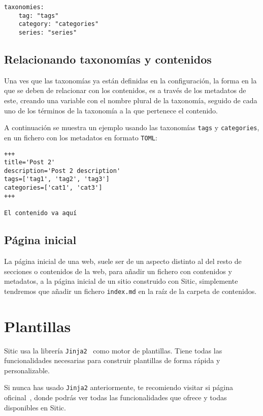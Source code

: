 \begin{verbatim}
taxonomies:
    tag: "tags"
    category: "categories"
    series: "series"
\end{verbatim}

\subsection{Relacionando taxonomías y contenidos}

Una ves que las taxonomías ya están definidas en la configuración, la forma en la que se deben de relacionar
con los contenidos, es a través de los metadatos de este, creando una variable con el nombre plural de la
taxonomía, seguido de cada uno de los términos de la taxonomía a la que pertenece el contenido.

A continuación se muestra un ejemplo usando las taxonomías \texttt{tags} y \texttt{categories}, en un fichero
con los metadatos en formato \texttt{TOML}:

\begin{verbatim}
+++
title='Post 2'
description='Post 2 description'
tags=['tag1', 'tag2', 'tag3']
categories=['cat1', 'cat3']
+++

El contenido va aquí
\end{verbatim}


\subsection{Página inicial}

La página inicial de una web, suele ser de un aspecto distinto al del resto de secciones o contenidos
de la web, para añadir un fichero con contenidos y metadatos, a la página inicial de un sitio
construido con Sitic, simplemente tendremos que añadir un fichero \texttt{index.md} en la raíz de
la carpeta de contenidos.


\section{Plantillas}

Sitic usa la librería \texttt{Jinja2}~\cite{jinja} como motor de plantillas. Tiene todas las funcionalidades
necesarias para construir plantillas de forma rápida y personalizable.

Si nunca has usado \texttt{Jinja2} anteriormente, te recomiendo visitar si página oficinal~\cite{jinja},
donde podrás ver todas las funcionalidades que ofrece y todas disponibles en Sitic.

